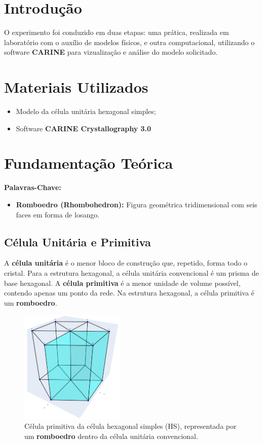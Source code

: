 \documentclass[10pt,twocolumn,letterpaper]{article}
\begin{document}
\section{Introdução}
\hspace{1cm} O experimento foi conduzido em duas etapas: uma prática, realizada em laboratório com o auxílio de modelos físicos, e outra computacional, utilizando o software \textbf{CARINE} para vizualização e análise do modelo solicitado. 

\section{Materiais Utilizados}
\begin{itemize}
    \item Modelo da célula unitária hexagonal simples;
    \item Software \textbf{CARINE Crystallography 3.0}
\end{itemize}

\section{Fundamentação Teórica}

\begin{mdframed}
\textbf{\color{primaryBlue}Palavras-Chave:}
\begin{itemize}

    \item \textbf{Romboedro (Rhombohedron):} Figura geométrica tridimensional com seis faces em forma de losango. 

\end{itemize}
\end{mdframed}

\subsection{Célula Unitária e Primitiva}
\hspace{1cm} A \textbf{\color{primaryBlue}célula unitária} é o menor bloco de construção que, repetido, forma todo o cristal. Para a estrutura hexagonal, a célula unitária convencional é um prisma de base hexagonal. A \textbf{\color{accentTeal}célula primitiva} é a menor unidade de volume possível, contendo apenas um ponto da rede. Na estrutura hexagonal, a célula primitiva é um \textbf{romboedro}.

\begin{figure}[h!]
\centering
\includegraphics[width=5cm]{PrimitiveCell.png}
\caption{Célula primitiva da célula hexagonal simples (HS), representada por um \textbf{romboedro} dentro da célula unitária convencional.}
\end{figure}
\end{document}
